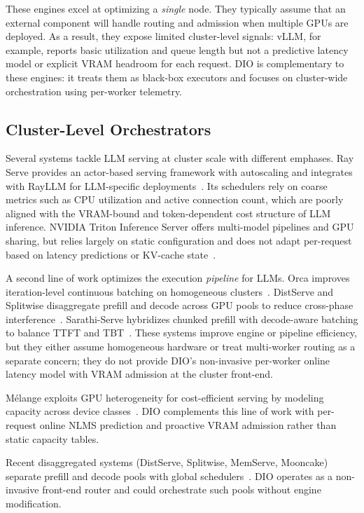 \documentclass[10pt,twocolumn,letterpaper]{article}
\begin{document}
These engines excel at optimizing a \emph{single} node.
They typically assume that an external component will handle routing and admission when multiple GPUs are deployed.
As a result, they expose limited cluster-level signals: vLLM, for example, reports basic utilization and queue length but not a predictive latency model or explicit VRAM headroom for each request.
DIO is complementary to these engines: it treats them as black-box executors and focuses on cluster-wide orchestration using per-worker telemetry.

\subsection{Cluster-Level Orchestrators}

Several systems tackle LLM serving at cluster scale with different emphases.
Ray Serve provides an actor-based serving framework with autoscaling and integrates with RayLLM for LLM-specific deployments~\cite{rayserve,rayllm}.
Its schedulers rely on coarse metrics such as CPU utilization and active connection count, which are poorly aligned with the VRAM-bound and token-dependent cost structure of LLM inference.
NVIDIA Triton Inference Server offers multi-model pipelines and GPU sharing, but relies largely on static configuration and does not adapt per-request based on latency predictions or KV-cache state~\cite{triton}.

A second line of work optimizes the execution \emph{pipeline} for LLMs.
Orca improves iteration-level continuous batching on homogeneous clusters~\cite{orca}.
DistServe and Splitwise disaggregate prefill and decode across GPU pools to reduce cross-phase interference~\cite{distserve,splitwise}.
Sarathi-Serve hybridizes chunked prefill with decode-aware batching to balance TTFT and TBT~\cite{bullet}.
These systems improve engine or pipeline efficiency, but they either assume homogeneous hardware or treat multi-worker routing as a separate concern; they do not provide DIO's non-invasive per-worker online latency model with VRAM admission at the cluster front-end.

Mélange exploits GPU heterogeneity for cost-efficient serving by modeling capacity across device classes~\cite{melange}.
DIO complements this line of work with per-request online NLMS prediction and proactive VRAM admission rather than static capacity tables.

Recent disaggregated systems (DistServe, Splitwise, MemServe, Mooncake) separate prefill and decode pools with global schedulers~\cite{distserve,splitwise,memserve,mooncake}.
DIO operates as a non-invasive front-end router and could orchestrate such pools without engine modification.
\end{document}
